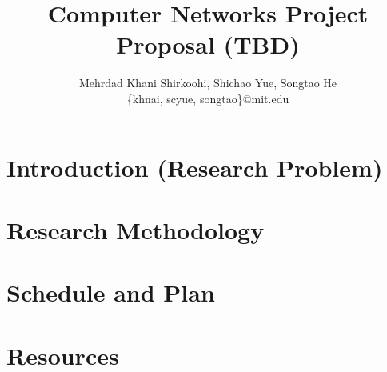 \documentclass[letterpaper,10pt,onecolumn]{article}
\title{Computer Networks Project Proposal (TBD)}
\author{Mehrdad Khani Shirkoohi, Shichao Yue, Songtao He \\
\{khnai, scyue, songtao\}@mit.edu
}
\begin{document}
\date{}
\maketitle
\section{Introduction (Research Problem)}
\section{Research Methodology}
\section{Schedule and Plan}
\section{Resources}
\end{document}
